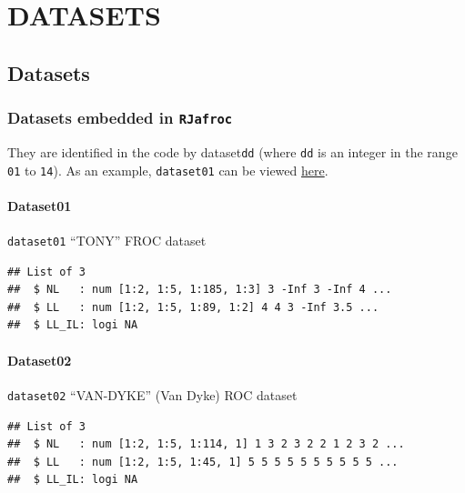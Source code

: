 \documentclass[
]{book}
\begin{document}
\hypertarget{part-datasets}{%
\part*{DATASETS}\label{part-datasets}}

\hypertarget{datasets}{%
\chapter{Datasets}\label{datasets}}

\hypertarget{datasets-datasetsdd}{%
\section{\texorpdfstring{Datasets embedded in \texttt{RJafroc}}{Datasets embedded in RJafroc}}\label{datasets-datasetsdd}}

They are identified in the code by dataset\texttt{dd} (where \texttt{dd} is an integer in the range \texttt{01} to \texttt{14}). As an example, \texttt{dataset01} can be viewed \href{https://dpc10ster.github.io/RJafroc/reference/dataset01.html}{here}.

\hypertarget{datasets-dataset01}{%
\subsection{Dataset01}\label{datasets-dataset01}}

\texttt{dataset01} ``TONY'' FROC dataset \citep{chakraborty2011estimating}

\begin{verbatim}
## List of 3
##  $ NL   : num [1:2, 1:5, 1:185, 1:3] 3 -Inf 3 -Inf 4 ...
##  $ LL   : num [1:2, 1:5, 1:89, 1:2] 4 4 3 -Inf 3.5 ...
##  $ LL_IL: logi NA
\end{verbatim}

\hypertarget{datasets-dataset02}{%
\subsection{Dataset02}\label{datasets-dataset02}}

\texttt{dataset02} ``VAN-DYKE'' (Van Dyke) ROC dataset \citep{RN1993}

\begin{verbatim}
## List of 3
##  $ NL   : num [1:2, 1:5, 1:114, 1] 1 3 2 3 2 2 1 2 3 2 ...
##  $ LL   : num [1:2, 1:5, 1:45, 1] 5 5 5 5 5 5 5 5 5 5 ...
##  $ LL_IL: logi NA
\end{verbatim}
\end{document}
